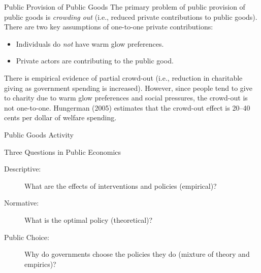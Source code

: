 \documentclass[10pt]{extarticle}
\begin{document}
  \begin{problem}{Public Provision of Public Goods}
    The primary problem of public provision of public goods is \textit{crowding out} (i.e., reduced private contributions to public goods). There are two key assumptions of one-to-one private contributions:
    \begin{itemize}
      \item Individuals do \textit{not} have warm glow preferences.
      \item Private actors are contributing to the public good.
    \end{itemize}
    There is empirical evidence of partial crowd-out (i.e., reduction in charitable giving as government spending is increased). However, since people tend to give to charity due to warm glow preferences and social pressures, the crowd-out is not one-to-one. Hungerman (2005) estimates that the crowd-out effect is 20–40 cents per dollar of welfare spending.
  \end{problem}
  \begin{problem}{Public Goods Activity}
    \begin{tcbraster}[raster columns = 1,colframe = black!75!white,colback=white]
    \end{tcbraster}
  \end{problem}
  \begin{problem}{Three Questions in Public Economics}
    \begin{description}
      \item[Descriptive:] What are the effects of interventions and policies (empirical)?
      \item[Normative:] What is the optimal policy (theoretical)?
      \item[Public Choice:] Why do governments choose the policies they do (mixture of theory and empirics)?
    \end{description}
  \end{problem}
\end{document}
